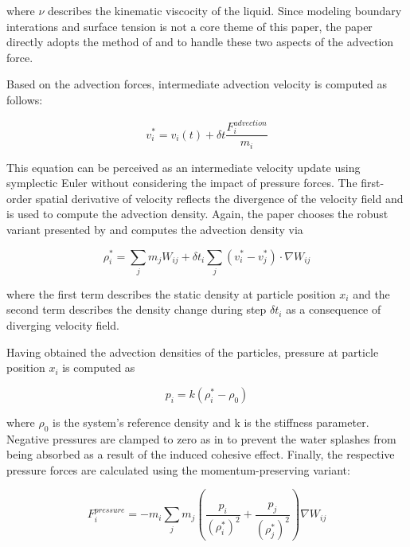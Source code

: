 \documentclass[
	11pt, 
	DIV10,
	ngerman,
	a4paper, 
	oneside, 
	headings=normal, 
	captions=tableheading,
	final, 
	numbers=noenddot
]{scrartcl}
\begin{document}
where $ \nu $ describes the kinematic viscocity of the liquid. Since modeling boundary interations and surface tension is not a core theme of this paper, the paper directly adopts the method of \cite{akinci2012versatile} and \cite{huber2015evaluation} to handle these two aspects of the advection force.
\par
Based on the advection forces, intermediate advection velocity is computed as follows:

\begin{equation}
	\label{eq3}
	v_{i}^{*} = v_{i}(t) + \delta t\frac{F_{i}^{advection}}{m_{i}}
\end{equation}

This equation can be perceived as an intermediate velocity update using symplectic Euler without considering the impact of pressure forces. The first-order spatial derivative of velocity reflects the divergence of the velocity field and is used to compute the advection density. Again, the paper chooses the robust variant presented by \cite{monaghan1992smoothed} and computes the advection density via

\begin{equation}
	\label{eq4}
	\rho_{i}^{*} = \sum_{j}m_{j}W_{ij} + \delta t_{i}\sum_{j}(v_{i}^{*} - v_{j}^{*})\cdot \nabla W_{ij}
\end{equation}

where the first term describes the static density at particle position $ x_{i} $ and the second term describes the density change during step $ \delta t_{i} $ as a consequence of diverging velocity field.
\par
Having obtained the advection densities of the particles, pressure at particle position $ x_{i} $ is computed as

\begin{equation}
	\label{eq8}
	p_{i} = k(\rho_{i}^{*} - \rho_{0})
\end{equation}

where $ \rho_{0} $ is the system's reference density and k is the stiffness parameter. Negative pressures are clamped to zero as in \cite{ihmsen2013implicit} to prevent the water splashes from being absorbed as a result of the induced cohesive effect. Finally, the respective pressure forces are calculated using the momentum-preserving variant:

\begin{equation}
	\label{eq5}
	F_{i}^{pressure} = -m_{i}\sum_{j}m_{j}\left(\frac{p_{i}}{(\rho_{i}^{*})^{2}} + \frac{p_{j}}{(\rho_{j}^{*})^{2}}\right)\nabla W_{ij}
\end{equation}
\end{document}
